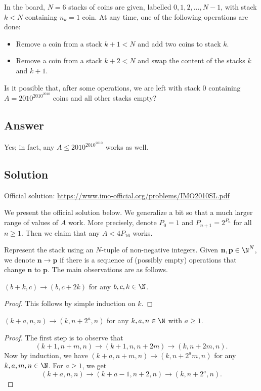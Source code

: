 In the board, $N = 6$ stacks of coins are given, labelled $0, 1, 2, \ldots, N - 1$, with stack $k < N$ containing $n_k = 1$ coin.
At any time, one of the following operations are done:

\begin{itemize}
    \item   Remove a coin from a stack $k + 1 < N$ and add two coins to stack $k$.
    \item   Remove a coin from a stack $k + 2 < N$ and swap the content of the stacks $k$ and $k + 1$.
\end{itemize}

Is it possible that, after some operations, we are left with stack $0$ containing $A = 2010^{2010^{2010}}$ coins and all other stacks empty?



\subsection*{Answer}

Yes; in fact, any $A \leq 2010^{2010^{2010}}$ works as well.



\subsection*{Solution}

Official solution: \url{https://www.imo-official.org/problems/IMO2010SL.pdf}

We present the official solution below.
We generalize a bit so that a much larger range of values of $A$ work.
More precisely, denote $P_0 = 1$ and $P_{n + 1} = 2^{P_n}$ for all $n \geq 1$.
Then we claim that any $A < 4P_{16}$ works.

Represent the stack using an $N$-tuple of non-negative integers.
Given $\mathbf{n}, \mathbf{p} \in \N^N$, we denote $\mathbf{n} \to \mathbf{p}$ if there is a sequence of (possibly empty) operations that change $\mathbf{n}$ to $\mathbf{p}$.
The main observations are as follows.

\begin{lemma}
$(b + k, c) \to (b, c + 2k)$ for any $b, c, k \in \N$.
\end{lemma}
\begin{proof}
This follows by simple induction on $k$.
\end{proof}

\begin{lemma}
$(k + a, n, n) \to (k, n + 2^a, n)$ for any $k, a, n \in \N$ with $a \geq 1$.
\end{lemma}
\begin{proof}
The first step is to observe that
\[ (k + 1, n + m, n) \to (k + 1, n, n + 2m) \to (k, n + 2m, n). \]
Now by induction, we have $(k + a, n + m, n) \to (k, n + 2^a m, n)$ for any $k, a, m, n \in \N$.
For $a \geq 1$, we get
\[ (k + a, n, n) \to (k + a - 1, n + 2, n) \to (k, n + 2^a, n). \]
\end{proof}

